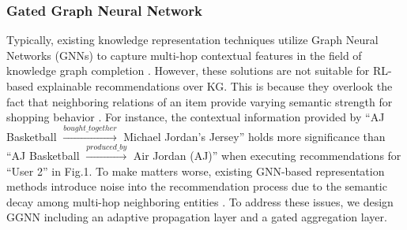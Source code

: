 \documentclass[conference]{IEEEtran}
\begin{document}
\subsubsection{Gated Graph Neural Network}
Typically, existing knowledge representation techniques utilize Graph Neural Networks (GNNs) to capture multi-hop contextual features in the field of knowledge graph completion \cite{KGC2} \cite{KGC1}. However, these solutions are not suitable for RL-based explainable recommendations over KG. This is because they overlook the fact that neighboring relations of an item provide varying semantic strength  for shopping behavior \cite{GNNDIS1}. For instance, the contextual information provided by ``AJ Basketball $\stackrel{bought\_together}{\longrightarrow}$ Michael Jordan's Jersey'' holds more significance than ``AJ Basketball $\stackrel{produced\_by}{\longrightarrow}$ Air Jordan (AJ)'' when executing recommendations for ``User 2'' in Fig.1. To make matters worse, existing GNN-based representation methods introduce noise into the recommendation process due to the semantic decay  among multi-hop neighboring entities \cite{GGNNnoise}. To address these issues, we design GGNN including an adaptive propagation layer and a gated aggregation layer. 

\end{document}
